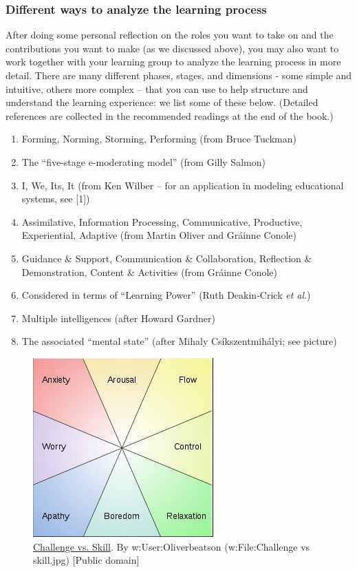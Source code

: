 \subsubsection{Different ways to analyze the learning process}

After doing some personal reflection on the roles you want to take on
and the contributions you want to make (as we discussed above), you may
also want to work together with your learning group to analyze the
learning process in more detail. There are many different phases,
stages, and dimensions - some simple and intuitive, others more complex
-- that you can use to help structure and understand the learning
experience: we list some of these below. (Detailed references are
collected in the recommended readings at the end of the book.)

\begin{enumerate}
\item
  Forming, Norming, Storming, Performing (from Bruce Tuckman)
\item
  The ``five-stage e-moderating model'' (from Gilly Salmon)
\item
  I, We, Its, It (from Ken Wilber -- for an application in modeling
  educational systems, see {[}1{]})
\item
  Assimilative, Information Processing, Communicative, Productive,
  Experiential, Adaptive (from Martin Oliver and Gráinne Conole)
\item
  Guidance \& Support, Communication \& Collaboration, Reflection \&
  Demonstration, Content \& Activities (from Gráinne Conole)
\item
  Considered in terms of ``Learning Power'' (Ruth Deakin-Crick \emph{et
  al}.)
\item
  Multiple intelligences (after Howard Gardner)
\item
  The associated ``mental state'' (after Mihaly Csíkszentmihályi; see
  picture)
\end{enumerate}

\begin{figure}
\begin{center}
\includegraphics[width=.6\textwidth]{../pictures/challenge.jpg}
\end{center}
\caption*{
 \href{http://commons.wikimedia.org/wiki/File\%3AChallenge\_vs\_skill.svg}{Challenge
 vs. Skill}. By w:User:Oliverbeatson (w:File:Challenge vs skill.jpg)
{[}Public domain{]}}
\end{figure}

